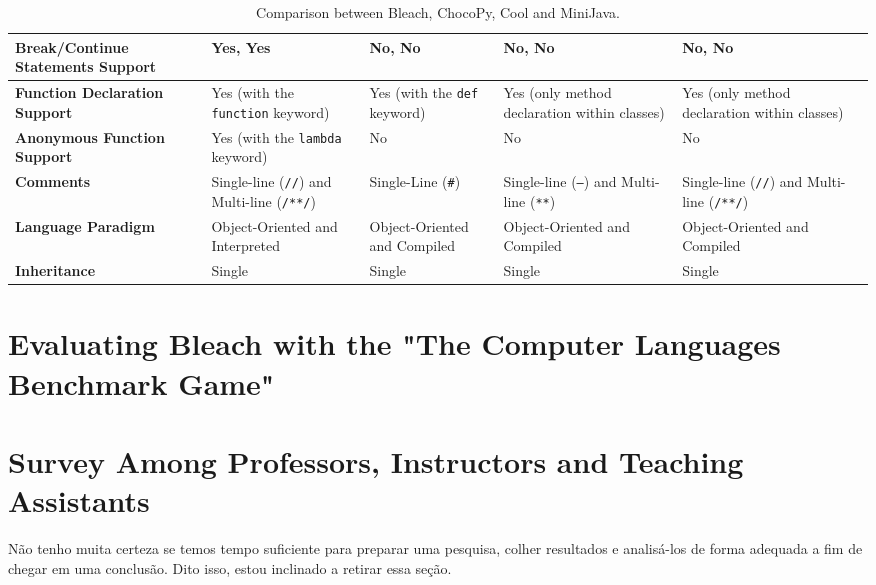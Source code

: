 \begin{table}[h!]
\begin{tabular}{|p{3.2cm}|p{3cm}|p{3cm}|p{3cm}|p{3cm}|p{3cm}|}
        \hline
        \textbf{Break/Continue Statements Support} & Yes, Yes & No, No & No, No & No, No \\
        \hline
        \textbf{Function Declaration Support} & Yes (with the \texttt{function} keyword) & Yes (with the \texttt{def} keyword) & Yes (only method declaration within classes) & Yes (only method declaration within classes) \\
        \hline
        \textbf{Anonymous Function Support} & Yes (with the \texttt{lambda} keyword) & No & No & No \\
        \hline
        \textbf{Comments} & Single-line (\texttt{//}) and Multi-line (\texttt{/**/}) & Single-Line (\texttt{\#}) & Single-line (\texttt{---}) and Multi-line (\texttt{**}) & Single-line (\texttt{//}) and Multi-line (\texttt{/**/}) \\
        \hline
        \textbf{Language Paradigm} & Object-Oriented and Interpreted & Object-Oriented and Compiled & Object-Oriented and Compiled & Object-Oriented and Compiled \\
        \hline
        \textbf{Inheritance} & Single & Single & Single & Single \\
        \hline
    \end{tabular}
    \caption{Comparison between Bleach, ChocoPy, Cool and MiniJava.}
    \label{tab:example5x5}
\end{table}


\section{Evaluating Bleach with the "The Computer Languages Benchmark Game"}

\section{Survey Among Professors, Instructors and Teaching Assistants}
Não tenho muita certeza se temos tempo suficiente para preparar uma pesquisa, colher resultados e analisá-los de forma adequada a fim de chegar em uma conclusão. Dito isso, estou inclinado a retirar essa seção.